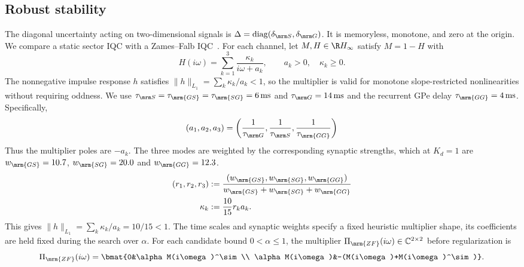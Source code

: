\subsection{Robust stability}

The diagonal uncertainty acting on two-dimensional signals is
$\Delta=\operatorname{diag}(\delta_{\mrm S},\delta_{\mrm G})$. It is memoryless,
monotone, and zero at the origin. We compare a static sector IQC with a
Zames--Falb IQC~\cite{zames1968stability,
turner2022zamesfalbmultipliersdontpanic}. For each channel, let
$M,H\in\R H_\infty$ satisfy $M=1-H$
with
\begin{equation*}
 H(i\omega)=\sum_{k=1}^3\frac{\kappa_{k}}{i\omega+a_{k}},
 \qquad a_{k}>0,\quad\kappa_{k}\geq0.
\end{equation*}
The nonnegative impulse response $h$ satisfies
$\|h\|_{L_1}=\sum_k\kappa_{k}/a_{k}<1$, so the multiplier is valid for
monotone slope-restricted nonlinearities without requiring oddness. We
use $\tau_{\mrm S}= \tau_\mrm{GS} = \tau_\mrm{SG}=6\,\mathrm{ms}$ and
$\tau_{\mrm G}=14\,\mathrm{ms}$ and the recurrent GPe delay
$\tau_{\mrm{GG}}=4\,\mathrm{ms}$. Specifically,
\begin{equation*}
 (a_{1},a_{2},a_{3})
 =\left(\frac{1}{\tau_{\mrm G}},\frac{1}{\tau_{\mrm S}},
          \frac{1}{\tau_{\mrm{GG}}}\right)
\end{equation*}
Thus the multiplier poles are $-a_{k}$. The three modes are weighted by the corresponding synaptic
strengths, which at $K_d=1$ are $w_\mrm{GS} = 10.7$, $w_\mrm{SG}=20.0$ and $w_\mrm{GG}=12.3$.
\begin{equation*}
 \begin{aligned}
 (r_1,r_2,r_3)&:=
 \frac{(w_{\mrm{GS}},w_{\mrm{SG}},w_{\mrm{GG}})}
 {w_{\mrm{GS}}+w_{\mrm{SG}}+w_{\mrm{GG}}}\\
 \kappa_{k}&:=\frac{10}{15}r_k a_{k}.
 \end{aligned}
\end{equation*}
This gives $\|h\|_{L_1}=\sum_k\kappa_{k}/a_{k}=10/15<1$.
The time scales and synaptic weights specify a fixed heuristic multiplier
shape, its coefficients are held fixed during the search over $\alpha$.
For each candidate bound $0<\alpha\leq1$, the multiplier
$\Pi_\mrm{ZF}(i\omega)\in\mathbb C^{2\times2}$ before regularization is
\begin{equation*}
 \Pi_\mrm{ZF}(i\omega)=
 \bmat{0&\alpha M(i\omega)^\sim\\
       \alpha M(i\omega)&-(M(i\omega)+M(i\omega)^\sim)}.
\end{equation*}
